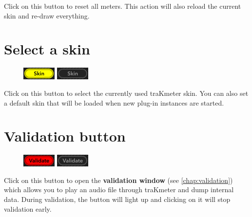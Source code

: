 Click on this button to reset all meters.  This action will also
reload the current skin and re-draw everything.

\section{Select a skin}

\begin{figure}
  \includegraphics[scale=\screenshotscale,clip]{include/images/button_skin_on.png}
  \newline \vspace{-0.9\baselineskip}
  \includegraphics[scale=\screenshotscale,clip]{include/images/button_skin_off.png}
\end{figure}

Click on this button to select the currently used traKmeter skin.  You
can also set a default skin that will be loaded when new plug-in
instances are started.

\section{Validation button}
\label{sec:validation_button}

\begin{figure}
  \includegraphics[scale=\screenshotscale,clip]{include/images/button_validate_on.png}
  \newline \vspace{-0.9\baselineskip}
  \includegraphics[scale=\screenshotscale,clip]{include/images/button_validate_off.png}
\end{figure}

Click on this button to open the \textbf{validation window} (see
\ref{chap:validation}) which allows you to play an audio file through
traKmeter and dump internal data.  During validation, the button will
light up and clicking on it will stop validation early.

